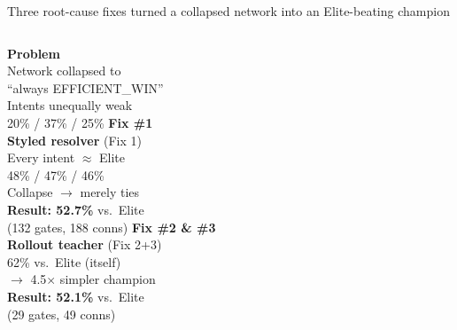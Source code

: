 \documentclass[10pt]{beamer}
\begin{document}
\begin{frame}{Three root-cause fixes turned a collapsed network into an Elite-beating champion}
  \centering
  \vspace{8pt}
  \begin{columns}[T]
      \centering
      \textbf{Problem}\\[2pt]
      \scriptsize
      Network collapsed to\\``always EFFICIENT\_WIN''\\
      Intents unequally weak\\20\% / 37\% / 25\%
      \centering
      \textbf{Fix \#1}\\[2pt]
      \scriptsize
      \textbf{Styled resolver} (Fix 1)\\
      Every intent $\approx$ Elite\\
      48\% / 47\% / 46\%\\
      Collapse $\rightarrow$ merely ties\\[2pt]
      \textbf{Result: 52.7\%} vs.\ Elite\\
      (132 gates, 188 conns)
      \centering
      \textbf{Fix \#2 \& \#3}\\[2pt]
      \scriptsize
      \textbf{Rollout teacher} (Fix 2+3)\\
      62\% vs.\ Elite (itself)\\
      $\rightarrow$ 4.5$\times$ simpler champion\\[2pt]
      \textbf{Result: 52.1\%} vs.\ Elite\\
      (29 gates, 49 conns)\\
    \end{columns}
  \vspace{6pt}
  \centering
\end{frame}
\end{document}
